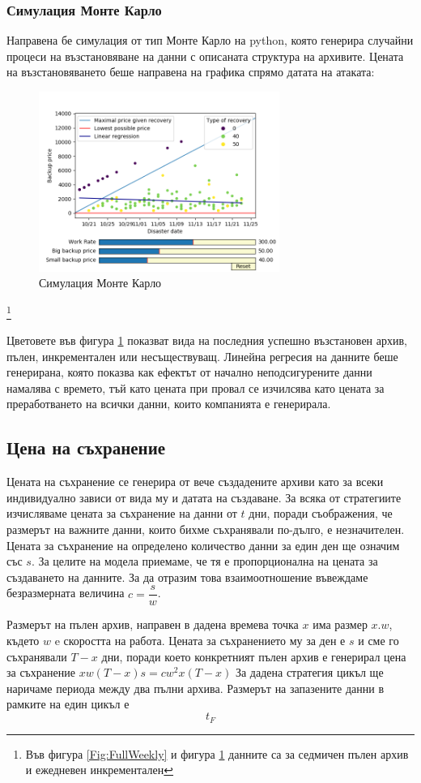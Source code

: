 \documentclass[11pt, a4paper]{article}
\theoremstyle{definition}
\newcommand\blfootnote[1]{%
	\begingroup
	\renewcommand\thefootnote{}\footnote{#1}%
	\addtocounter{footnote}{-1}%
	\endgroup
}
\begin{document}
			\subsubsection{Симулация Монте Карло}
				Направена бе симулация от тип Монте Карло на python, която генерира случайни процеси на възстановяване на данни с описаната структура на архивите. Цената на възстановяването беше направена на графика спрямо датата на атаката:
				\begin{figure}[H]
					\begin{minipage}{1.0\textwidth}
						\centering
						\includegraphics[width=0.7\textwidth]{Weekly_full_carlo.png}
						\caption{Симулация Монте Карло}\label{Fig:MonteCarlo}
					\end{minipage}
				\end{figure}
				\blfootnote{Във фигура \ref{Fig:FullWeekly} и фигура \ref{Fig:MonteCarlo} данните са за седмичен пълен архив и ежедневен инкрементален}
				Цветовете във фигура \ref{Fig:MonteCarlo} показват вида на последния успешно възстановен архив, пълен, инкрементален или несъществуващ.
				\newpage
				Линейна регресия на данните беше генерирана, която показва как ефектът от начално неподсигурените данни намалява с времето, тъй като цената при провал се изчилсява като цената за преработването на всички данни, които компанията е генерирала.
		\subsection{Цена на съхранение}
			Цената на съхранение се генерира от вече създадените архиви като за всеки индивидуално зависи от вида му и датата на създаване. За всяка от стратегиите изчисляваме цената за съхранение на данни от $t$ дни, поради съображения, че размерът на важните данни, които бихме съхранявали по-дълго, е незначителен. Цената за съхранение на определено количество  данни за един ден ще означим със $s$. За целите на модела приемаме, че тя е пропорционална на цената за създаването на данните. За да отразим това взаимоотношение въвеждаме безразмерната величина $c = \dfrac{s}{w}$.\par
			Размерът на пълен архив, направен в дадена времева точка $x$ има размер $x.w$, където $w$ e скоростта на работа. Цената за съхранението му за ден е $s$ и сме го съхранявали $T-x$ дни, поради което конкретният пълен архив е генерирал цена за съхранение $xw(T-x)s = cw^2x(T-x)$   За дадена стратегия цикъл ще наричаме периода между два пълни архива. Размерът на запазените данни в рамките на един цикъл е 
			\begin{equation}
				t_F
			\end{equation}
\end{document}
